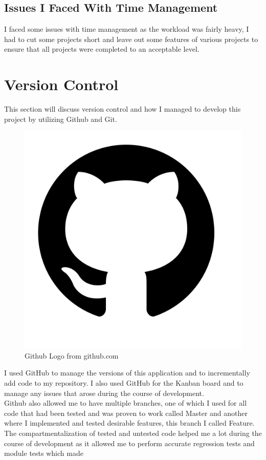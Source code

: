 \subsection{Issues I Faced With Time Management}
I faced some issues with time management as the workload was fairly heavy, I had to cut some projects short and leave out some features of various projects to ensure that all projects were completed to an acceptable level.
\section{Version Control}
This section will discuss version control and how I managed to develop this project by utilizing Github and Git.
\begin{figure}
\includegraphics[width=3\linewidth]{img/github}
\caption{Github Logo from github.com}
\label{fig:wrapfig}
\end{figure}
I used GitHub to manage the versions of this application and to incrementally add code to my repository.
I also used GitHub for the Kanban board and to manage any issues that arose during the course of development.
\\
Github also allowed me to have multiple branches, one of which I used for all code that had been tested and was proven to work called Master and another where I implemented and tested desirable features, this branch I called Feature.  The compartmentalization of tested and untested code helped me a lot during the course of development as it allowed me to perform accurate regression tests and module tests which made
